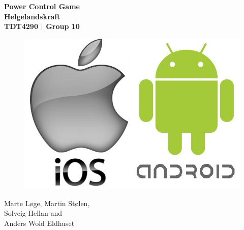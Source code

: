 \begin{titlepage}
\begin{center}

{\Huge \bf Power Control Game} \\[1.0cm]
{\Huge \bf Helgelandskraft} \\[1.0cm]
{\Large \bf TDT4290 | Group 10} \\[4.0cm]

\begin{figure}[!ht]
	\centering
	\includegraphics[scale=0.5]{pictures/android-ios.jpeg}
\end{figure}
\vspace{3.5cm}

{Marte Løge, Martin Stølen, \\
Solveig Hellan and \\
Anders Wold Eldhuset}


\end{center}
\end{titlepage}